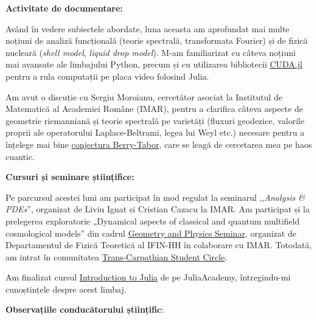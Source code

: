 \vspace{0.5em}

\textbf{Activitate de documentare:}

Având în vedere subiectele abordate, luna aceasta am aprofundat mai multe noțiuni de analiză funcțională (teorie spectrală, transformata Fourier) și de fizică nucleară (\emph{shell model}, \emph{liquid drop model}). M-am familiarizat cu câteva noțiuni mai avansate ale limbajului Python, precum și cu utilizarea bibliotecii \href{https://github.com/JuliaGPU/CUDA.jl}{CUDA.jl} pentru a rula computații pe placa video folosind Julia.

Am avut o discuție cu Sergiu Moroianu, cercetător asociat la Institutul de Matematică al Academiei Române (IMAR), pentru a clarifica câteva aspecte de geometrie riemanniană  și teorie spectrală pe varietăți (fluxuri geodezice, valorile proprii ale operatorului Laplace-Beltrami, legea lui Weyl etc.) necesare pentru a înțelege mai bine \href{https://people.maths.bris.ac.uk/~majm/bib/3ecm.pdf}{conjectura Berry-Tabor}, care se leagă de cercetarea mea pe haos cuantic.

\vspace{0.5em}

\textbf{Cursuri și seminare științifice:}

Pe parcursul acestei luni am participat în mod regulat la seminarul ,,\emph{Analysis \& PDEs}'', organizat de Liviu Ignat și Cristian Cazacu la IMAR. Am participat și la prelegerea exploratorie „Dynamical aspects of classical and quantum multifield cosmological models” din cadrul \href{https://events.theory.nipne.ro/gap/index.php/seminar}{Geometry and Physics Seminar}, organizat de Departamentul de Fizică Teoretică al IFIN-HH în colaborare cu IMAR. Totodată, am intrat în comunitatea \href{https://events.theory.nipne.ro/gap/index.php/student-homepage}{Trans-Carpathian Student Circle}.

Am finalizat cursul \href{https://juliaacademy.com/p/intro-to-julia}{Introduction to Julia} de pe JuliaAcademy, întregindu-mi cunoștințele despre acest limbaj.

\vspace{0.5em}

\textbf{Observațiile conducătorului științific}:

\vspace{3em}

